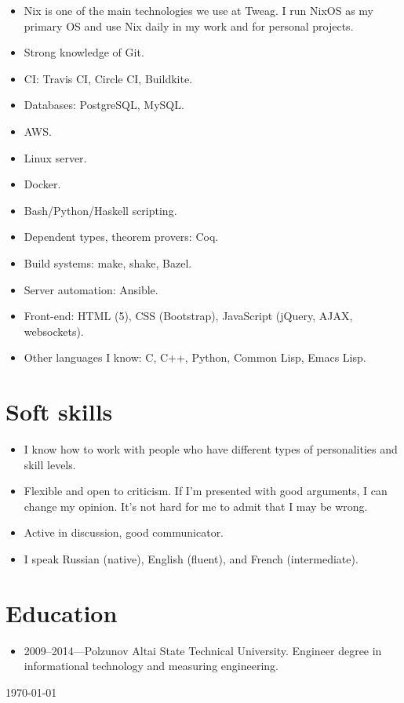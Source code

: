 \documentclass[a4paper,12pt]{article}
\begin{document}
\begin{itemize}[noitemsep]
\item Nix is one of the main technologies we use at Tweag. I run NixOS as my
  primary OS and use Nix daily in my work and for personal projects.
\item Strong knowledge of Git.
\item CI: Travis CI, Circle CI, Buildkite.
\item Databases: PostgreSQL, MySQL.
\item AWS.
\item Linux server.
\item Docker.
\item Bash/Python/Haskell scripting.
\item Dependent types, theorem provers: Coq.
\item Build systems: make, shake, Bazel.
\item Server automation: Ansible.
\item Front-end: HTML (5), CSS (Bootstrap), JavaScript (jQuery, AJAX,
  websockets).
\item Other languages I know: C, C++, Python, Common Lisp, Emacs Lisp.
\end{itemize}

\section*{Soft skills}

\begin{itemize}[noitemsep]
\item I know how to work with people who have different types of
  personalities and skill levels.
\item Flexible and open to criticism. If I'm presented with good arguments,
  I can change my opinion. It's not hard for me to admit that I may be
  wrong.
\item Active in discussion, good communicator.
\item I speak Russian (native), English (fluent), and French (intermediate).
\end{itemize}

\section*{Education}

\begin{itemize}[noitemsep]
\item 2009--2014---Polzunov Altai State Technical University. Engineer
  degree in informational technology and measuring engineering.
\end{itemize}

\begin{flushright}
  \today
\end{flushright}
\end{document}
